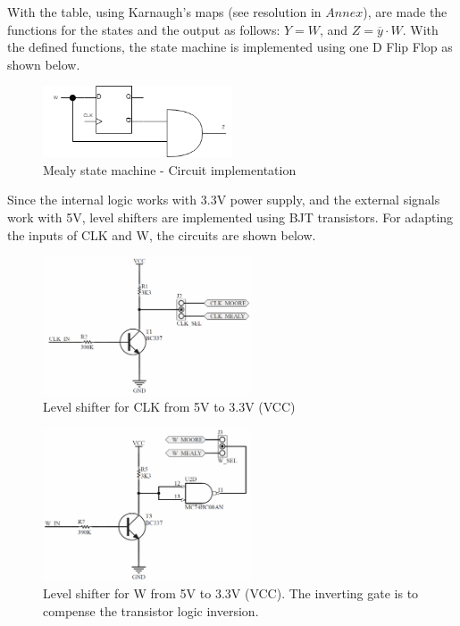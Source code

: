 With the table, using Karnaugh's maps (see resolution in $Annex$), are made 
the functions for the states and the output as follows: $Y = W$, and $Z = \overline{y} \cdot W$.
With the defined functions, the state machine is 
implemented using one D Flip Flop as shown below.

\begin{figure}[H]
    \begin{centering}
    \includegraphics[width=0.5\textwidth]{data/Graficos3/3b_Compuertas_Mealy.png}
    \par\end{centering}
    \caption{Mealy state machine - Circuit implementation}
\end{figure}
Since the internal logic works with 3.3V power supply, 
and the external signals work with 5V, level shifters 
are implemented using BJT transistors. For adapting
the inputs of CLK and W, the circuits are shown 
below. 

\begin{figure}[H]
    \begin{centering}
    \includegraphics[width=0.55\textwidth]{data/Graficos3/CLK_Driver.png}
    \par\end{centering}
    \caption{Level shifter for CLK from 5V to 3.3V (VCC)}
\end{figure}

\begin{figure}[H]
    \begin{centering}
    \includegraphics[width=0.55\textwidth]{data/Graficos3/W_Driver.png}
    \par\end{centering}
    \caption{Level shifter for W from 5V to 3.3V (VCC). The inverting gate is to compense the transistor logic inversion.}
\end{figure}

